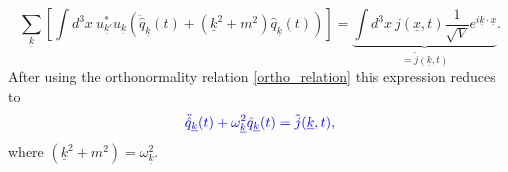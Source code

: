 \documentclass[12pt, titlepage]{article}
\begin{document}
\begin{equation}
 \sum_{\underline{k}}
 \left[ 
 \int d^{3}x \ u^{\ast}_{\underline{k}'}u_{\underline{k}}
 \left( 
 \ddot{\hat{q}}_{\underline{k}}(t) 
 +
 \left( \underline{k}^{2}+m^{2}\right) 
 \hat{q}_{\underline{k}}(t) 
 \right) 
  \right] 
  ={\underbrace{\int d^{3}x \ 
j(\underline{x},t) \dfrac{1}{\sqrt{V}} e^{i\underline{k}\cdot\underline{x}}}_{=\tilde{j}(\underline{k},t)}}
  .
\end{equation}
After using the orthonormality relation \eqref{ortho_relation} this expression reduces to
\begin{equation}\label{eq_for_q}
 \textcolor[RGB]{0,0,204}{
\ddot{\hat{q}}_{\underline{k}}(t) 
 +
\omega_{\underline{k}}^{2}
 \hat{q}_{\underline{k}}(t) 
  =\tilde{j}(\underline{k},t)
  ,}
\end{equation}
where  $ (\underline{k}^{2}+m^{2}) = \omega_{\underline{k}}^{2} $.
\end{document}
